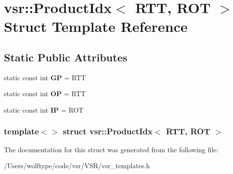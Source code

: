 \hypertarget{structvsr_1_1_product_idx_3_01_r_t_t_00_01_r_o_t_01_4}{\section{vsr\-:\-:Product\-Idx$<$ R\-T\-T, R\-O\-T $>$ Struct Template Reference}
\label{structvsr_1_1_product_idx_3_01_r_t_t_00_01_r_o_t_01_4}
}
\subsection*{Static Public Attributes}
\begin{DoxyCompactItemize}
\item 
\hypertarget{structvsr_1_1_product_idx_3_01_r_t_t_00_01_r_o_t_01_4_a21d8d91caff97cdafb7f39975801f32a}{static const int {\bfseries G\-P} = R\-T\-T}\label{structvsr_1_1_product_idx_3_01_r_t_t_00_01_r_o_t_01_4_a21d8d91caff97cdafb7f39975801f32a}

\item 
\hypertarget{structvsr_1_1_product_idx_3_01_r_t_t_00_01_r_o_t_01_4_a19a3eef145582c4b832127578a1deb11}{static const int {\bfseries O\-P} = R\-T\-T}\label{structvsr_1_1_product_idx_3_01_r_t_t_00_01_r_o_t_01_4_a19a3eef145582c4b832127578a1deb11}

\item 
\hypertarget{structvsr_1_1_product_idx_3_01_r_t_t_00_01_r_o_t_01_4_acb8d740c47155658a4cf912fe59bd9af}{static const int {\bfseries I\-P} = R\-O\-T}\label{structvsr_1_1_product_idx_3_01_r_t_t_00_01_r_o_t_01_4_acb8d740c47155658a4cf912fe59bd9af}

\end{DoxyCompactItemize}
\subsubsection*{template$<$$>$ struct vsr\-::\-Product\-Idx$<$ R\-T\-T, R\-O\-T $>$}



The documentation for this struct was generated from the following file\-:\begin{DoxyCompactItemize}
\item 
/\-Users/wolftype/code/vsr/\-V\-S\-R/vsr\-\_\-templates.\-h\end{DoxyCompactItemize}
